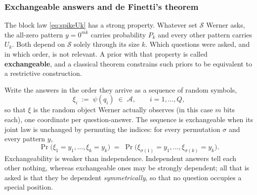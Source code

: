 \documentclass[11pt]{article}
\begin{document}
\subsubsection{Exchangeable answers and de Finetti's theorem}
\label{sec:spikedefinetti}

The block law \eqref{eq:spikeUk} has a strong property. Whatever set $\mathcal S$
Werner asks, the all-zero pattern $y=0^{mk}$ carries probability $P_k$ and every other pattern
carries $U_k$. Both depend on $\mathcal S$ solely through its size $k$. 
Which questions were asked, and in which order, is not relevant. 
A prior with that property is called \textbf{exchangeable}, and
a classical theorem constrains such priors to be equivalent to a restrictive construction.

Write the answers in the order they arrive as a sequence of random
symbols,
%
\begin{equation}
  \xi_i \;:=\; \psi(q_i) \;\in\; \mathcal A,
  \qquad i = 1, \ldots, Q,
  \label{eq:xiseq}
\end{equation}
%
so that $\xi$ is the random object Werner actually observes (in this case $m$ bits each), one
coordinate per question-answer. The sequence is exchangeable when its joint law
is unchanged by permuting the indices: for every permutation $\sigma$
and every pattern $y$,
%
\begin{equation}
  \Pr\big(\xi_1 = y_1, \ldots, \xi_k = y_k\big)
  \;=\;
  \Pr\big(\xi_{\sigma(1)} = y_1, \ldots, \xi_{\sigma(k)} = y_k\big).
  \label{eq:exchangeable}
\end{equation}
%
Exchangeability is weaker than independence. Independent answers tell
each other nothing, whereas exchangeable ones may be strongly
dependent; all that is asked is that they be dependent
\emph{symmetrically}, so that no question occupies a special position.
\end{document}
